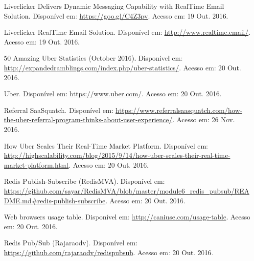 \documentclass[brazil,ruledheader]{abntifes}
\begin{document}
	\tableofcontents{}
	
	
	
	
	
	
	
	
	
	
	\begin{thebibliography}{9}
		Liveclicker Delivers Dynamic Messaging Capability with RealTime Email Solution. Disponível em: \url{https://goo.gl/C4Z3pv}.
		Acesso em: 19 Out. 2016.
		
		Liveclicker RealTime Email Solution. Disponível em: \url{http://www.realtime.email/}.
		Acesso em: 19 Out. 2016.
		
		50 Amazing Uber Statistics (October 2016). Disponível em: \url{http://expandedramblings.com/index.php/uber-statistics/}.
		Acesso em: 20 Out. 2016.
		
		Uber. Disponível em: \url{https://www.uber.com/}.
		Acesso em: 20 Out. 2016.
		
		Referral SaaSquatch. Disponível em: \url{https://www.referralsaasquatch.com/how-the-uber-referral-program-thinks-about-user-experience/}.
		Acesso em: 26 Nov. 2016.
		
		How Uber Scales Their Real-Time Market Platform. Disponível em: \url{http://highscalability.com/blog/2015/9/14/how-uber-scales-their-real-time-market-platform.html}.
		Acesso em: 20 Out. 2016.
		
		Redis Publish-Subscribe (RedisMVA). Disponível em: \url{https://github.com/sayar/RedisMVA/blob/master/module6_redis_pubsub/README.md#redis-publish-subscribe}.
		Acesso em: 20 Out. 2016.
		
		Web browsers usage table. Disponível em: \url{http://caniuse.com/usage-table}.
		Acesso em: 20 Out. 2016.
		
		Redis Pub/Sub (Rajaraodv). Disponível em: \url{https://github.com/rajaraodv/redispubsub}.
		Acesso em: 20 Out. 2016.
		

\end{thebibliography}
\end{document}
